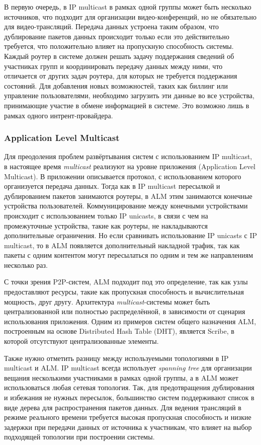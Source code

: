 		В первую очередь, в IP multicast в рамках одной группы может быть несколько источников, что подходит
		для организации видео-конференций, но не обязательно для видео-трансляций. Передача данных устроена таким
		образом, что дублирование пакетов данных происходит только если это действительно требуется, что положительно
		влияет на пропускную способность системы. Каждый роутер в системе должен решать задачу поддержания сведений об
		участниках групп и координировать передачу данных между ними, что отличается от других задач роутера, для
		которых не требуется поддержания состояний. Для добавления новых возможностей, таких как биллинг или управление
		пользователями, необходимо загрузить эти данные во все устройства, принимающие участие в обмене информацией в
		системе. Это возможно лишь в рамках одного интрент-провайдера.

		\subsubsection{Application Level Multicast}
		Для преодоления проблем развёртывания систем с использованием IP multicast, в настоящее время \textit{multicast}
		реализуют на уровне приложения (Application Level Multicast). В приложении описывается протокол, с
		использованием которого организуется передача данных. Тогда как в IP multicast пересылкой и дублированием
		пакетов занимаются роутеры, в ALM этим занимаются конечные устройства пользователей. Коммуницирование между
		конечными устройствами происходит с использованием только IP unicasts, в связи с чем на промежуточные устройства,
		такие как роутеры, не накладываются дополнительные ограничения. Но если сравнивать использование IP unicasts с
		IP multicast, то в ALM появляется дополнительный накладной трафик, так как пакеты с одним контентом могут
		пересылаться по одним и тем же направлениям несколько раз.

		С точки зрения P2P-систем, ALM подходит под это определение, так как узлы предоставляют ресурсы, такие как
		пропускная способность и вычислительная мощность, друг другу. Архитектура \textit{multicast}-системы может быть
		централизованной или полностью распределённой, в зависимости от сценария использования приложения. Одним из
		примеров систем общего назначения ALM, построенным на основе Distributed Hash Table (DHT), является Scribe, в
		которой отсутствуют централизованные элементы.

		Также нужно отметить разницу между используемыми топологиями в IP multicast и ALM. IP multicast всегда
		использует \textit{spanning tree} для организации вещания несколькими участниками в рамках одной группы, а в ALM
		может использоваться любая сетевая топология. Так, для предотвращения дублирования и избежания не нужных
		пересылок, большинство систем поддерживают список в виде дерева для распространения пакетов данных. Для ведения
		трансляций в режиме реального времени требуется высокая пропускная способность и низкие задержки при передачи
		данных от источника к участникам, что влияет на выбор подходящей топологии при построении системы.

